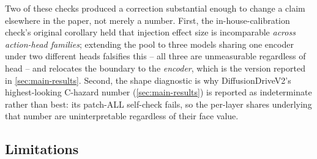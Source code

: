 \begin{table}[t]
\begin{tabular}{p{}p{}p{}}
\bottomrule
\end{tabular}
\end{table}

Two of these checks produced a correction substantial enough to change a claim elsewhere
in the paper, not merely a number. First, the in-house-calibration check's original
corollary held that injection effect size is incomparable \emph{across action-head
families}; extending the pool to three models sharing one encoder under two different
heads falsifies this -- all three are unmeasurable regardless of head -- and relocates
the boundary to the \emph{encoder}, which is the version reported in
\cref{sec:main-results}. Second, the shape diagnostic is why DiffusionDriveV2's
highest-looking C-hazard number (\cref{sec:main-results}) is reported as indeterminate
rather than best: its patch-ALL self-check fails, so the per-layer shares underlying that
number are uninterpretable regardless of their face value.

\subsection{Limitations}

